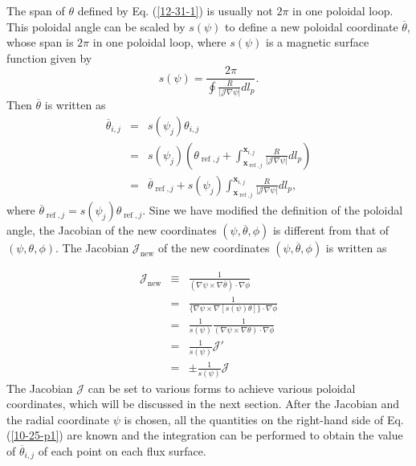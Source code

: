 \documentclass{article}
\newcommand{\tmop}[1]{\ensuremath{\operatorname{#1}}}
\begin{document}
The span of $\theta$ defined by Eq. (\ref{12-31-1}) is usually not $2 \pi$ in
one poloidal loop. This poloidal angle can be scaled by $s (\psi)$ to define a
new poloidal coordinate $\overline{\theta}$, whose span is $2 \pi$ in one
poloidal loop, where $s (\psi)$ is a magnetic surface function given by
\begin{equation}
  s (\psi) = \frac{2 \pi}{\oint \frac{R}{|\mathcal{J} \nabla \psi |} d l_p} .
\end{equation}
Then $\overline{\theta}$ is written as
\begin{eqnarray}
  \overline{\theta}_{i, j} & = & s (\psi_j) \theta_{i, j} \nonumber\\
  & = & s (\psi_j) \left( \theta_{\tmop{ref}, j} +
  \int_{\mathbf{x}_{\tmop{ref}, j}}^{\mathbf{x}_{i, j}} \frac{R}{|\mathcal{J}
  \nabla \psi |} d l_p \right) \nonumber\\
  & = & \overline{\theta}_{\tmop{ref}, j} + s (\psi_j)
  \int_{\mathbf{x}_{\tmop{ref}, j}}^{\mathbf{x}_{i, j}} \frac{R}{|\mathcal{J}
  \nabla \psi |} d l_p,  \label{10-25-p1}
\end{eqnarray}
where $\overline{\theta}_{\tmop{ref}, j} = s (\psi_j) \theta_{\tmop{ref}, j}$.
Sine we have modified the definition of the poloidal angle, the Jacobian of
the new coordinates $(\psi, \overline{\theta}, \phi)$ is different from that
of $(\psi, \theta, \phi)$. The Jacobian $\mathcal{J}_{\tmop{new}}$ of the new
coordinates $(\psi, \overline{\theta}, \phi)$ is written as


\begin{eqnarray}
  \mathcal{J}_{\tmop{new}} & \equiv & \frac{1}{(\nabla \psi \times \nabla
  \overline{\theta}) \cdot \nabla \phi} \nonumber\\
  & = & \frac{1}{\{\nabla \psi \times \nabla [s (\psi) \theta]\} \cdot \nabla
  \phi} \nonumber\\
  & = & \frac{1}{s (\psi)}  \frac{1}{(\nabla \psi \times \nabla \theta) \cdot
  \nabla \phi} \nonumber\\
  & = & \frac{1}{s (\psi)} \mathcal{J}' \nonumber\\
  & = & \pm \frac{1}{s (\psi)} \mathcal{J}  \label{10-25-p7}
\end{eqnarray}
The Jacobian $\mathcal{J}$ can be set to various forms to achieve various
poloidal coordinates, which will be discussed in the next section. After the
Jacobian and the radial coordinate $\psi$ is chosen, all the quantities on the
right-hand side of Eq. (\ref{10-25-p1}) are known and the integration can be
performed to obtain the value of $\overline{\theta}_{i, j}$ of each point on
each flux surface.
\end{document}
